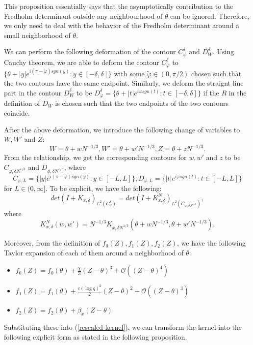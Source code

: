 This proposition essentially says that the asymptotically contribution to the Fredholm determinant outside any neighbourhood of $\theta$ can be ignored. Therefore, we only need to deal with the behavior of the Fredholm determinant around a small neighborhood of $\theta$. 

We can perform the following deformation of the contour $C_{\varphi}^{\delta}$ and $D_W^{\delta}$. Using Cauchy theorem, we are able to deform the contour $C_{\varphi}^{\delta}$ to $\{\theta + |y|e^{i(\pi - \tilde{\varphi}) sgn(y)}: y \in [-\delta, \delta]\}$ with some $\tilde{\varphi} \in (0, \pi / 2)$ chosen such that the two contours have the same endpoint. Similarly, we deform the straignt line part in the contour $D_W^{\delta}$ to be $D_{\varphi}^{\delta} = \{\theta + |t| e^{i \varphi sgn(t)}: t \in [-\delta, \delta] \}$ if the $R$ in the definition of $D_W$ is chosen such that the two endpoints of the two contours coincide. 

After the above deformation, we introduce the following change of variables to $W, W'$ and $Z$: $$W = \theta + wN^{-1/3}, W' = \theta + w' N^{-1/3}, Z = \theta + zN^{-1/3}.$$ From the relationship, we get the corresponding contours for $w, w'$ and $z$ to be $C_{\varphi,\delta N^{1/3}}$ and $D_{\phi, \delta N^{1/3}}$, where
$$C_{\varphi,L} = \{|y|e^{i(\pi - \varphi) sgn(y)}: y \in [-L, L]\}, D_{\varphi, L} = \{|t| e^{i \varphi sgn(t)}: t \in [-L, L]\}$$ for $L \in (0, \infty].$ To be explicit, we have the following: $$det(I+K_{x, \delta})_{L^2(C_{\varphi}^{\delta})} = det(I +K_{x, \delta}^N )_{L^2(C_{\varphi, \delta N^{1/3}})},$$ where 
\begin{equation}
\label{rescaled-kernel}
K_{x, \delta}^N(w,w') = N^{-1/3} K_{x, \delta N^{1/3}} (\theta + wN^{-1/3}, \theta + w'N^{-1/3}).
\end{equation}

Moreover, from the definition of $f_0(Z), f_1(Z), f_2(Z)$, we have the following Taylor expansion of each of them around a neighborhood of $\theta$:
\begin{itemize}
\item $f_0(Z) = f_0(\theta) + \frac{\chi}{3} (Z - \theta)^3 + \mathcal{O}((Z - \theta)^4)$
\item $f_1(Z) = f_1(\theta) + \frac{c(\log q)^2}{2} (Z - \theta)^2 + \mathcal{O}((Z - \theta)^3)$
\item $f_2(Z) = f_2(\theta) + \beta_x (Z - \theta)$
\end{itemize}
Substituting these into (\ref{rescaled-kernel}), we can transform the kernel into the following explicit form as stated in the following proposition.

